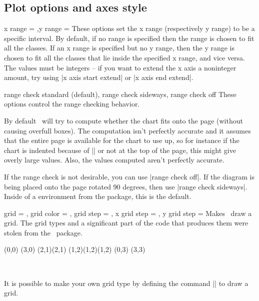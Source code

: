 \begin{sseqdata}[name = basic, cohomological Serre grading]
\subsection{Plot options and axes style}
\begin{keylist}{x range = ,y range = } These options set the x range (respectively y range) to be a specific
interval. By default, if no range is specified then the range is chosen to fit
all the classes. If an x range is specified but no y range, then the y range is
chosen to fit all the classes that lie inside the specified x range, and vice
versa. The values must be integers -- if you want to extend the x axis a
noninteger amount, try using |x axis start extend| or |x axis end extend|.
\end{keylist}

\begin{keylist}{range check standard (default), range check sideways, range check off}
These options control the range checking behavior.

By default \sseqpages\ will try to compute whether the chart fits onto the page
(without causing overfull boxes). The computation isn't perfectly accurate and
it assumes that the entire page is available for the chart to use up, so for
instance if the chart is indented because of |\textindent| or not at the top of
the page, this might give overly large values. Also, the values computed aren't
perfectly accurate.

If the range check is not desirable, you can use |range check off|. If the
diagram is being placed onto the page rotated 90 degrees, then use
%
|range check sideways|. Inside of a  environment from the
 package, this is the default.
\end{keylist}

\begin{keylist}{
    grid = ,
    grid color = ,
    grid step = ,
    x grid step = ,
    y grid step = 
}
Makes \sseqpages\  draw a grid. The grid types and a significant part of the code that produces them were stolen from the \sseqpkg\ package.
\begin{codeexample}[vbox]
\begin{sseqdata}[ name = grid example, scale = 0.8 ]
\class(0,0)
\class(3,0)
\class(2,1)\class(2,1)
\class(1,2)\class(1,2)\class(1,2)
\class(0,3)
\class(3,3)
\end{sseqdata}
\hbox{
\printpage[ name = grid example, grid = chess, title=chess ]
\qquad
\printpage[ name = grid example, grid = crossword, title=crossword ]
}
\vskip20pt
\hbox{
\printpage[ name = grid example, grid = go, title=go ]
\qquad
\printpage[ name = grid example, grid = none ]
}
\end{codeexample}
It is possible to make your own grid type by defining the command |\sseq@grid@yourgridname| to draw a grid.


\end{keylist}
\end{sseqdata}
